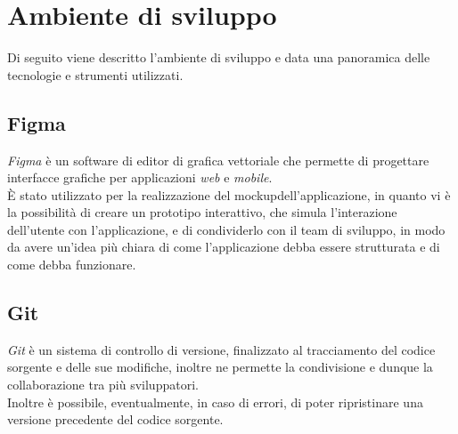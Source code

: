 


\section{Ambiente di sviluppo}
\label{sec:ambiente-sviluppo}
Di seguito viene descritto l'ambiente di sviluppo e data una panoramica delle tecnologie e strumenti utilizzati.

\subsection*{Figma}
\label{subsec:figma}

\emph{Figma}\cite{site:figma} è un software di editor di grafica vettoriale che permette di progettare interfacce grafiche per applicazioni \emph{web} e \emph{mobile}.\\
È stato utilizzato per la realizzazione del \gls{mockup}\glsoccur dell'applicazione, in quanto vi è la possibilità di creare un prototipo interattivo, che simula l'interazione dell'utente con l'applicazione, e di condividerlo con il team di sviluppo, in modo da avere un'idea più chiara di come l'applicazione debba essere strutturata e di come debba funzionare.\\

\subsection*{Git}
\label{subsec:git}

\emph{Git}\cite{site:git} è un sistema di controllo di versione, finalizzato al tracciamento del codice sorgente e delle sue modifiche, inoltre ne permette la condivisione e dunque la collaborazione tra più sviluppatori.\\
Inoltre è possibile, eventualmente, in caso di errori, di poter ripristinare una versione precedente del codice sorgente.\\

